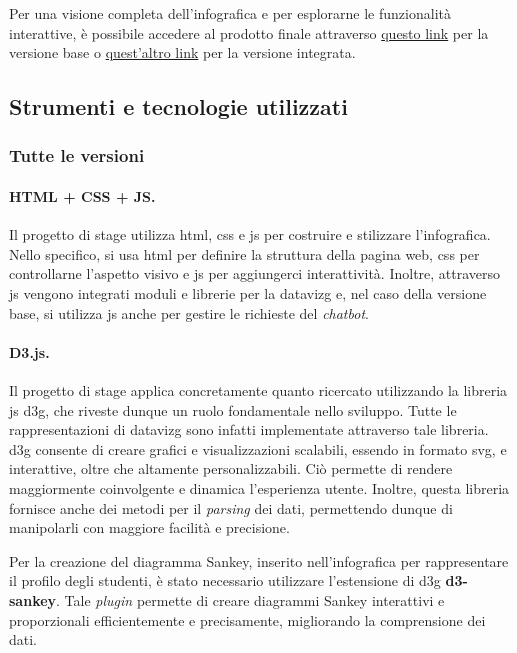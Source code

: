 Per una visione completa dell'infografica e per esplorarne le funzionalità interattive, è possibile accedere al prodotto finale attraverso \href{https://github.com/jeskarr/progetto_stage/tree/main/infographic-example}{questo link} 
per la versione base o \href{https://github.com/jeskarr/progetto_stage/tree/VERSIONE_INTEGRATA/infographic-example}{quest'altro link} per la versione integrata.


\subsection{Strumenti e tecnologie utilizzati}\label{subsec:tecnologie}
\subsubsection{Tutte le versioni}
\paragraph{HTML + CSS + JS.}
Il progetto di stage utilizza \gls{html}, \gls{css} e \gls{js} per costruire e stilizzare l'infografica. Nello specifico, si usa \gls{html} per definire la struttura della pagina web, \gls{css} per controllarne l'aspetto visivo 
e \gls{js} per aggiungerci interattività. Inoltre, attraverso \gls{js} vengono integrati moduli e librerie per la \gls{datavizg} e, nel caso della versione base, si utilizza \gls{js} anche per gestire le richieste del \emph{chatbot}.

\paragraph{D3.js.}
Il progetto di stage applica concretamente quanto ricercato utilizzando la libreria \gls{js} \gls{d3g}, che riveste dunque un ruolo fondamentale nello sviluppo.
Tutte le rappresentazioni di \gls{datavizg} sono infatti implementate attraverso tale libreria.
\gls{d3g} consente di creare grafici e visualizzazioni scalabili, essendo in formato \gls{svg}, e interattive, oltre che altamente personalizzabili. 
Ciò permette di rendere maggiormente coinvolgente e dinamica l'esperienza utente. 
Inoltre, questa libreria fornisce anche dei metodi per il \emph{parsing} dei dati, permettendo dunque di manipolarli con maggiore facilità e precisione.

Per la creazione del diagramma Sankey, inserito nell'infografica per rappresentare il profilo degli studenti, è stato necessario utilizzare l'estensione di \gls{d3g}
\textbf{d3-sankey}. Tale \emph{plugin} permette di creare diagrammi Sankey interattivi e proporzionali efficientemente e precisamente, migliorando la comprensione dei dati.

